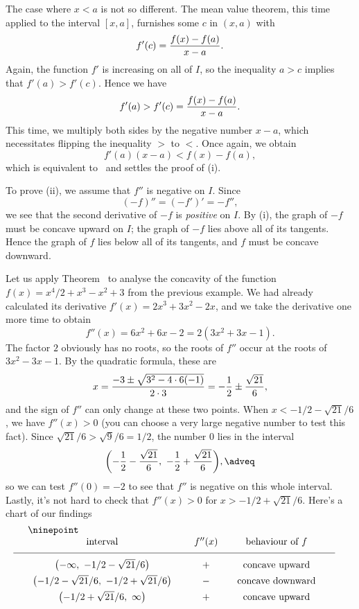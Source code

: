 The case where $x<a$ is not so different. The mean value theorem, this time applied to the interval
$[x,a]$, furnishes some $c$ in $(x,a)$ with
$$f'(c) = {f(x) - f(a)\over x-a}.$$
Again, the function $f'$ is increasing on all of $I$, so the inequality $a>c$ implies that $f'(a) > f'(c)$.
Hence we have
$$f'(a) > f'(c) = {f(x) - f(a) \over x-a}.$$
This time, we multiply both sides by the negative number $x-a$, which necessitates flipping the inequality
$>$ to $<$. Once again, we obtain
$$ f'(a)(x-a) < f(x) - f(a),$$
which is equivalent to~ and settles the proof of (i).

To prove (ii), we assume that $f''$ is negative on $I$. Since
$$(-f)'' = (-f')' = -f'',$$
we see that the second derivative of $-f$ is {\it positive} on $I$. By (i), the graph of $-f$ must
be concave upward on $I$; the graph of
$-f$ lies above all of its tangents. Hence the graph of $f$ lies below all of its
tangents, and $f$ must be concave downward.\slug

Let us apply Theorem~{\thmconcavity} to analyse the concavity of the function
$f(x) = x^4 / 2 + x^3 - x^2 + 3$ from the previous example. We had already calculated its derivative
$f'(x) = 2x^3 + 3x^2 - 2x$, and we take the derivative one more time to obtain
$$f''(x) = 6x^2 + 6x - 2 = 2(3x^2  + 3x - 1).$$
The factor $2$ obviously has no roots, so the roots of $f''$ occur at the roots of
$3x^2 - 3x-1$. By the quadratic formula, these are
$$x = {-3 \pm \sqrt{3^2 - 4\cdot 6(-1)}\over 2\cdot 3}
= -{1\over 2} \pm {\sqrt{21}\over 6},$$
and the sign of $f''$ can only change at these two points.
When $x < -1/2 - \sqrt{21}/6$, we have $f''(x) > 0$ (you can choose a very large negative number to test
this fact). Since $\sqrt{21}/ 6 > \sqrt{9}/ 6 = 1/2$, the number $0$ lies in the interval
\edef\eqconcaveinterval{\the\eqcount}
$$\biggl( -{1\over 2} - {\sqrt{21}\over 6} ,\  -{1\over 2} + {\sqrt{21}\over 6}\biggr),\adveq$$
so we can test $f''(0) = -2$ to see that $f''$ is negative on this whole interval. Lastly, it's
not hard to check that $f''(x) > 0$ for $x > -1/2 + \sqrt{21}/6$. Here's a chart of our findings
$$
\vbox{\ninepoint
\tabskip=2em plus.2em minus .2em
\halign{
\hfil $#$ \hfil & \hfil$#$\hfil  & \hfil#\hfil\cr
\hbox{interval} & f''(x) & behaviour of $f$\cr
\noalign{\medskip}
\noalign{\hrule}
\noalign{\medskip}
\bigl(-\infty,\ -1/2-\sqrt{21}/6\bigr) & + & concave upward\cr
\noalign{\smallskip}
\bigl(-1/2-\sqrt{21}/6,\ -1/2 + \sqrt{21}/6\bigr)    & - & concave downward\cr
\noalign{\smallskip}
\bigl(-1/2 + \sqrt{21}/6,\ \infty\bigr) & + & concave upward\cr
}}
$$

